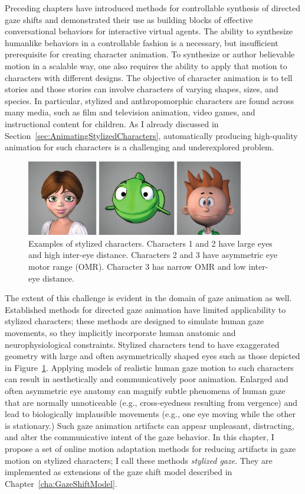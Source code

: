 Preceding chapters have introduced methods for controllable synthesis of directed gaze shifts and demonstrated their use as building blocks of effective conversational behaviors for interactive virtual agents. The ability to synthesize humanlike behaviors in a controllable fashion is a necessary, but insufficient prerequisite for creating character animation.
To synthesize or author believable motion in a scalable way, one also requires the ability to apply that motion to characters with different designs. The objective of character animation is to tell stories and those stories can involve characters of varying shapes, sizes, and species. In particular, stylized and anthropomorphic characters are found across many media, such as film and television animation, video games, and instructional content for children. As I already discussed in Section~\ref{sec:AnimatingStylizedCharacters}, automatically producing high-quality animation for such characters is a challenging and underexplored problem.

\begin{figure}
\centering
\includegraphics[width=0.85\textwidth]{stylizedgaze/Figures/StylizedCharacterExamples-small.pdf}
\caption{Examples of stylized characters. Characters 1 and 2 have large eyes and high inter-eye distance. Characters 2 and 3 have asymmetric eye motor range (OMR). Character 3 has narrow OMR and low inter-eye distance.}
\label{fig:StylizedCharacterExamples}
\end{figure}

The extent of this challenge is evident in the domain of gaze animation as well. Established methods for directed gaze animation have limited applicability to stylized characters; these methods are designed to simulate human gaze movements, so they implicitly incorporate human anatomic and neurophysiological constraints. Stylized characters tend to have exaggerated geometry with large and often asymmetrically shaped eyes such as those depicted in Figure~\ref{fig:StylizedCharacterExamples}. Applying models of realistic human gaze motion to such characters can result in aesthetically and communicatively poor animation. Enlarged and often asymmetric eye anatomy can magnify subtle phenomena of human gaze that are normally unnoticeable (e.g., cross-eyedness resulting from vergence) and lead to biologically implausible movements (e.g., one eye moving while the other is stationary.) Such gaze animation artifacts can appear unpleasant, distracting, and alter the communicative intent of the gaze behavior. In this chapter, I propose a set of online motion adaptation methods for reducing artifacts in gaze motion on stylized characters; I call these methods \emph{stylized gaze}. They are implemented as extensions of the gaze shift model described in Chapter~\ref{cha:GazeShiftModel}.

